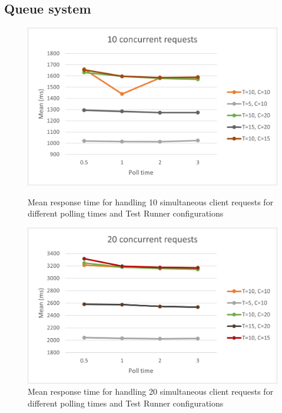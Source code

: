 \subsection{Queue system}
\begin{figure}[!tbp]
  \begin{minipage}[t]{0.4\textwidth}
    \centering
    \includegraphics[scale=0.65]{images/10.png}
    \caption{Mean response time for handling 10 simultaneous client requests for different polling times and Test Runner configurations}
    \label{fig:resultstart}
  \end{minipage}
  \hfill
  \begin{minipage}[t]{0.4\textwidth}
    \centering
    \includegraphics[scale=0.65]{images/20.png}
    \caption{Mean response time for handling 20 simultaneous client requests for different polling times and Test Runner configurations}
  \end{minipage}
  \begin{minipage}[t]{0.4\textwidth}

\end{minipage}
\end{figure}
